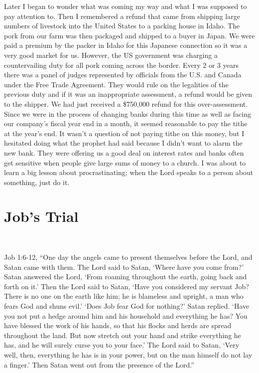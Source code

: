 \documentclass[oneside]{book}
\begin{document}
Later I began to wonder what was coming my way and what I was supposed to pay attention to. Then I remembered a refund that came from shipping large numbers of livestock into the United States to a packing house in Idaho. The pork from our farm was then packaged and shipped to a buyer in Japan. We were paid a premium by the packer in Idaho for this Japanese connection so it was a very good market for us. However, the US government was charging a countervailing duty for all pork coming across the border. Every 2 or 3 years there was a panel of judges represented by officials from the U.S. and Canada under the Free Trade Agreement. They would rule on the legalities of the previous duty and if it was an inappropriate assessment, a refund would be given to the shipper. We had just received a \$750,000 refund for this over-assessment. Since we were in the process of changing banks during this time as well as facing our company’s fiscal year end in a month, it seemed reasonable to pay the tithe at the year’s end. It wasn’t a question of not paying tithe on this money, but I hesitated doing what the prophet had said because I didn't want to alarm the new bank. They were offering us a good deal on interest rates and banks often get sensitive when people give large sums of money to a church. I was about to learn a big lesson about procrastinating; when the Lord speaks to a person about something, just do it.


\section{Job's Trial}
\

Job 1:6-12, “One day the angels came to present themselves before the Lord, and Satan came with them. The Lord said to Satan, ‘Where have you come from?’ Satan answered the Lord, ‘From roaming throughout the earth, going back and forth on it.’ Then the Lord said to Satan, ‘Have you considered my servant Job? There is no one on the earth like him; he is blameless and upright, a man who fears God and shuns evil.’ ‘Does Job fear God for nothing?’ Satan replied. ‘Have you not put a hedge around him and his household and everything he has? You have blessed the work of his hands, so that his flocks and herds are spread throughout the land. But now stretch out your hand and strike everything he has, and he will surely curse you to your face.’ The Lord said to Satan, ‘Very well, then, everything he has is in your power, but on the man himself do not lay a finger.’ Then Satan went out from the presence of the Lord.”
\end{document}
